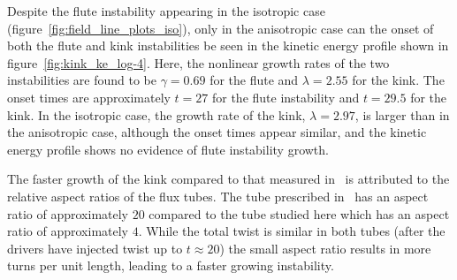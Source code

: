 \documentclass[fleqn,usenatbib]{mnras}
\begin{document}
Despite the flute instability appearing in the isotropic case
(figure~\ref{fig:field_line_plots_iso}), only in the anisotropic case can the
onset of both the flute and kink instabilities be seen in the kinetic energy
profile shown in figure~\ref{fig:kink_ke_log-4}. Here, the nonlinear growth
rates of the two instabilities are found to be $\gamma = 0.69$ for the flute
and $\lambda = 2.55$ for the kink. The onset times are approximately $t=27$ for
the flute instability and $t=29.5$ for the kink. In the isotropic case, the
growth rate of the kink, $\lambda = 2.97$, is larger than in the anisotropic
case, although the onset times appear similar, and the kinetic energy profile
shows no evidence of flute instability growth. 

The faster growth of the kink compared to that measured in~\citet{quinnEffectAnisotropicViscosity2020} is attributed to the relative
aspect ratios of the flux tubes. The tube prescribed in~\citet{quinnEffectAnisotropicViscosity2020} has an aspect ratio of
approximately $20$ compared to the tube studied here which has an aspect ratio
of approximately $4$. While the total twist is similar in both tubes (after the
drivers have injected twist up to $t\approx20$) the small aspect ratio results
in more turns per unit length, leading to a faster growing instability. 
\end{document}
